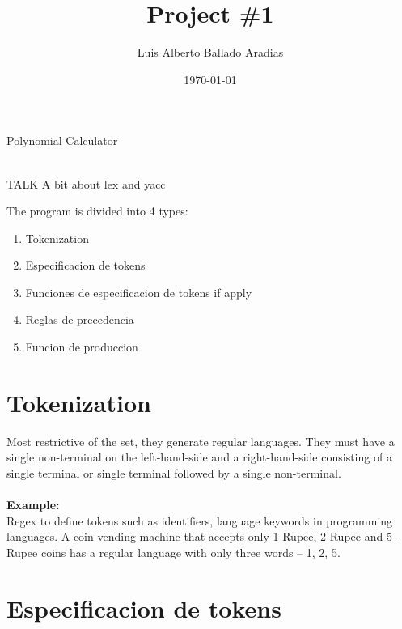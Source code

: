 \documentclass[
	12pt, %
]{fphw}
\title{Project \#1} %
\author{Luis Alberto Ballado Aradias} %
\date{\today} %
\institute{Centro de Investigación y de Estudios Avanzados del IPN \\ Unidad Tamaulipas} %
\begin{document}
\maketitle %

{\color{teal}
\dotfill
Polynomial Calculator
\dotfill}

\phantom{}\\
TALK A bit about lex and yacc


The program is divided into 4 types:
\begin{enumerate}
\item Tokenization
\item Especificacion de tokens
\item Funciones de especificacion de tokens if apply  
\item Reglas de precedencia
\item Funcion de produccion
\end{enumerate}

\newpage
\section*{{\color{BlueViolet}Tokenization}}

Most restrictive of the set, they generate regular languages. They must have a single non-terminal on the left-hand-side and a right-hand-side consisting of a single terminal or single terminal followed by a single non-terminal.\\\\

\textbf{Example:}\\

Regex to define tokens such as identifiers, language keywords in programming languages. A coin vending machine that accepts only 1-Rupee, 2-Rupee and 5-Rupee coins has a regular language with only three words – 1, 2, 5.

\newpage
\section*{{\color{Apricot}Especificacion de tokens}}
\end{document}

